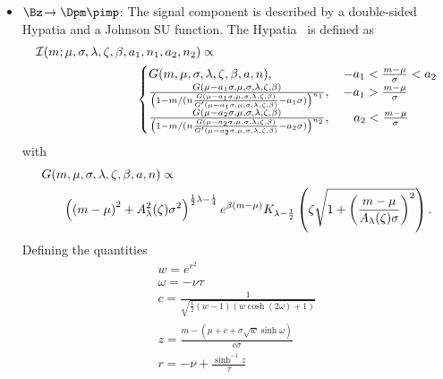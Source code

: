 \begin{itemize}
	\item $\Bz\!\to\Dpm\pimp$: The signal component is described by a double-sided Hypatia and a Johnson SU function.
	The Hypatia~\cite{Santos:2013ky} is defined as
	\begin{equation}
	\begin{aligned}
	&\mathcal{I}(m;\mu,\sigma,\lambda,\zeta,\beta,a_1,n_1,a_2,n_2) \propto\\
	&\hspace{2.8cm}\begin{cases}
	G(m,\mu,\sigma,\lambda,\zeta,\beta,a,n), &\,   - a_1 < \frac{m - \mu}{\sigma} < a_2 \\
	\frac{G(\mu - a_1 \sigma,\mu,\sigma,\lambda,\zeta,\beta)}{\left(1 - m/(n \frac{G(\mu - a_1\sigma,\mu,\sigma,\lambda,\zeta,\beta)}{G^\prime(\mu - a_1 \sigma,\mu,\sigma,\lambda,\zeta,\beta)} -a_1 \sigma)\right)^{n_1}},	&\,  - a_1 > \frac{m - \mu}{\sigma} \\
	\frac{G(\mu - a_2 \sigma,\mu,\sigma,\lambda,\zeta,\beta)}{\left(1 - m/(n \frac{G(\mu - a_2\sigma,\mu,\sigma,\lambda,\zeta,\beta)}{G^\prime(\mu - a_2 \sigma,\mu,\sigma,\lambda,\zeta,\beta)} -a_2 \sigma)\right)^{n_2}},	&\quad a_2 < \frac{m - \mu}{\sigma} \\
	\end{cases}
	\label{eq:ipatia}
	\end{aligned}
	\end{equation}
	with
	\begin{equation}
	\begin{aligned}
	&G(m,\mu,\sigma,\lambda,\zeta,\beta,a,n)\propto\\
	&\hspace{0.6cm}\left(\left(m-\mu\right)^2+A_\lambda^2(\zeta)\sigma^2\right)^{\frac{1}{2}\lambda-\frac{1}{4}}e^{\beta\left(m-\mu\right)}K_{\lambda-\frac{1}{2}}\left(\zeta\sqrt{1+\left(\frac{m-\mu}{A_\lambda(\zeta)\sigma}\right)^2}\right).
	\end{aligned}
	\end{equation}
	Defining the quantities
	\begin{align*}
	&w=e^{r^2}&\\
	&\omega=-\nu\tau&\\
	&c=\frac{1}{\sqrt{\frac{1}{2}\left(w-1\right)\left(w\cosh\!\left(2\omega\right)+1\right)}}&\\
	&z=\frac{m-\left(\mu+c+\sigma\sqrt{w}\sinh\omega\right)}{c\sigma}&\\
	&r=-\nu+\frac{\sinh^{-1}z}{\tau}&
	\end{align*}

\end{itemize}

